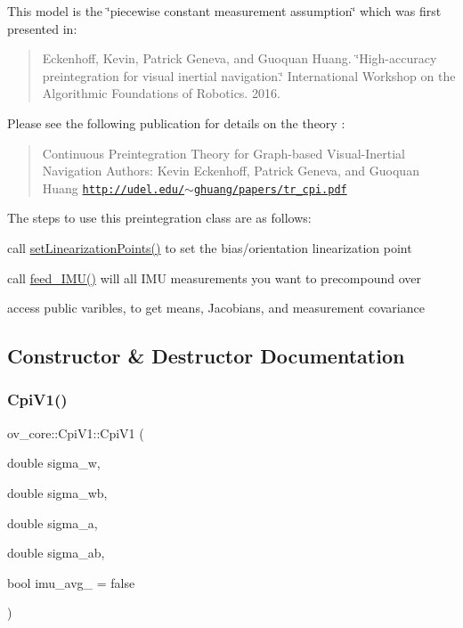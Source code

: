 This model is the \char`\"{}piecewise constant measurement assumption\char`\"{} which was first presented in\+: \begin{quote}
Eckenhoff, Kevin, Patrick Geneva, and Guoquan Huang. \char`\"{}\+High-\/accuracy preintegration for visual inertial navigation.\char`\"{} International Workshop on the Algorithmic Foundations of Robotics. 2016. \end{quote}
Please see the following publication for details on the theory \cite{Eckenhoff2019IJRR} \+: \begin{quote}
Continuous Preintegration Theory for Graph-\/based Visual-\/\+Inertial Navigation Authors\+: Kevin Eckenhoff, Patrick Geneva, and Guoquan Huang \href{http://udel.edu/~ghuang/papers/tr_cpi.pdf}{\tt http\+://udel.\+edu/$\sim$ghuang/papers/tr\+\_\+cpi.\+pdf} \end{quote}


The steps to use this preintegration class are as follows\+:
\begin{DoxyEnumerate}
\item call \hyperlink{classov__core_1_1CpiBase_a32c11e3e61dc8a524bf48a18504b5417}{set\+Linearization\+Points()} to set the bias/orientation linearization point
\item call \hyperlink{classov__core_1_1CpiV1_aafd93ac727dc176a9d5ca4b6d09d0cd2}{feed\+\_\+\+I\+M\+U()} will all I\+MU measurements you want to precompound over
\item access public varibles, to get means, Jacobians, and measurement covariance 
\end{DoxyEnumerate}

\subsection{Constructor \& Destructor Documentation}
\mbox{\label{classov__core_1_1CpiV1_a34e803dec05d4a2e009ed170175d19d7}} 
\subsubsection{\texorpdfstring{Cpi\+V1()}{CpiV1()}}
{\footnotesize\ttfamily ov\+\_\+core\+::\+Cpi\+V1\+::\+Cpi\+V1 (\begin{DoxyParamCaption}\item[{double}]{sigma\+\_\+w,  }\item[{double}]{sigma\+\_\+wb,  }\item[{double}]{sigma\+\_\+a,  }\item[{double}]{sigma\+\_\+ab,  }\item[{bool}]{imu\+\_\+avg\+\_\+ = {\ttfamily false} }\end{DoxyParamCaption})\hspace{0.3cm}{\ttfamily [inline]}}



